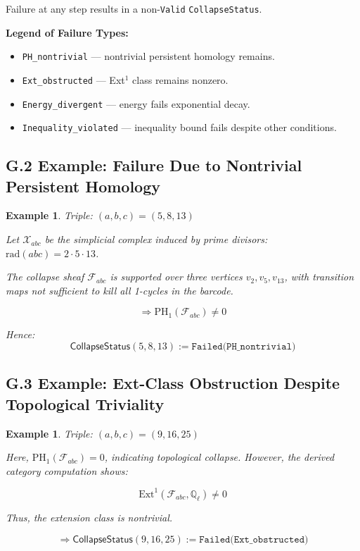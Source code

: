 \documentclass[11pt]{article}
\newtheorem{example}[theorem]{Example}
\begin{document}
Failure at any step results in a non-\texttt{Valid} \texttt{CollapseStatus}.

\vspace{1em}

\noindent
\textbf{Legend of Failure Types:}
\begin{itemize}
  \item \texttt{PH\_nontrivial} — nontrivial persistent homology remains.
  \item \texttt{Ext\_obstructed} — Ext$^1$ class remains nonzero.
  \item \texttt{Energy\_divergent} — energy fails exponential decay.
  \item \texttt{Inequality\_violated} — inequality bound fails despite other conditions.
\end{itemize}

\subsection*{G.2 Example: Failure Due to Nontrivial Persistent Homology}

\begin{example}
Triple: \( (a,b,c) = (5,8,13) \)

\vspace{0.5em}
\noindent
Let \( \mathcal{X}_{abc} \) be the simplicial complex induced by prime divisors: \( \mathrm{rad}(abc) = 2 \cdot 5 \cdot 13 \).

The collapse sheaf \( \mathcal{F}_{abc} \) is supported over three vertices \( v_2, v_5, v_{13} \),  
with transition maps not sufficient to kill all 1-cycles in the barcode.

\[
\Rightarrow \mathrm{PH}_1(\mathcal{F}_{abc}) \neq 0
\]

Hence:
\[
\mathsf{CollapseStatus}(5,8,13) := \texttt{Failed(PH\_nontrivial)}
\]
\end{example}

\subsection*{G.3 Example: Ext-Class Obstruction Despite Topological Triviality}

\begin{example}
Triple: \( (a,b,c) = (9,16,25) \)

\vspace{0.5em}
\noindent
Here, \( \mathrm{PH}_1(\mathcal{F}_{abc}) = 0 \), indicating topological collapse.  
However, the derived category computation shows:

\[
\mathrm{Ext}^1(\mathcal{F}_{abc}, \mathbb{Q}_\ell) \neq 0
\]

Thus, the extension class is nontrivial.

\[
\Rightarrow \mathsf{CollapseStatus}(9,16,25) := \texttt{Failed(Ext\_obstructed)}
\]
\end{example}
\end{document}
